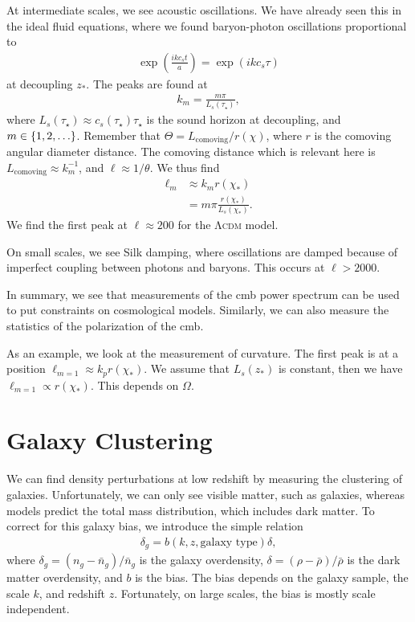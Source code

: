 At intermediate scales, we see acoustic oscillations. We have already seen this in the ideal fluid equations, where we found baryon-photon oscillations proportional to
\begin{align*}
	\exp(\frac{i k c_s t}{a})
	= \exp(i k c_s \tau)
\end{align*}
at decoupling $z_*$. The peaks are found at
\begin{align*}
	k_m = \frac{m \pi}{L_s(\tau_\star)},
\end{align*}
where $L_s(\tau_\star) \approx c_s(\tau_\star) \tau_\star$ is the sound horizon at decoupling, and $m \in \left\{ {1, 2, \dots} \right\}$.
Remember that $\Theta = L_\text{comoving} / r(\chi)$, where $r$ is the comoving angular diameter distance. The comoving distance which is relevant here is $L_\text{comoving} \approx k_m^{-1}$, and $\ell \approx 1/\theta$. We thus find
\begin{align*}
	\ell_m 
	&\approx k_m r(\chi_*)\\
	&= m \pi \frac{r(\chi_*)}{L_s(\chi_*)}.
\end{align*}
We find the first peak at $\ell \approx 200$ for the \textsc{Λcdm} model.

On small scales, we see Silk damping, where oscillations are damped because of imperfect coupling between photons and baryons. This occurs at $\ell > 2000$.

In summary, we see that measurements of the \ac{cmb} power spectrum can be used to put constraints on cosmological models.
Similarly, we can also measure the statistics of the polarization of the \ac{cmb}.


As an example, we look at the measurement of curvature. The first peak is at a position $\ell_{m=1} \approx k_p r(\chi_*)$. We assume that $L_s(z_*)$ is constant, then we have $\ell_{m=1} \propto r(\chi_*)$. This depends on $\Omega$.






\section{Galaxy Clustering}

We can find density perturbations at low redshift by measuring the clustering of galaxies. Unfortunately, we can only see visible matter, such as galaxies, whereas models predict the total mass distribution, which includes dark matter. To correct for this galaxy bias, we introduce the simple relation
\begin{align*}
	\delta_g = b(k, z, \text{galaxy type}) \delta,
\end{align*}
where
$\delta_g = (n_g - \bar{n}_g)/\bar{n}_g$ is the galaxy overdensity,
$\delta = (\rho-\bar{\rho})/\bar{\rho}$ is the dark matter overdensity,
and $b$ is the bias.
The bias depends on the galaxy sample, the scale $k$, and redshift $z$. Fortunately, on large scales, the bias is mostly scale independent.

